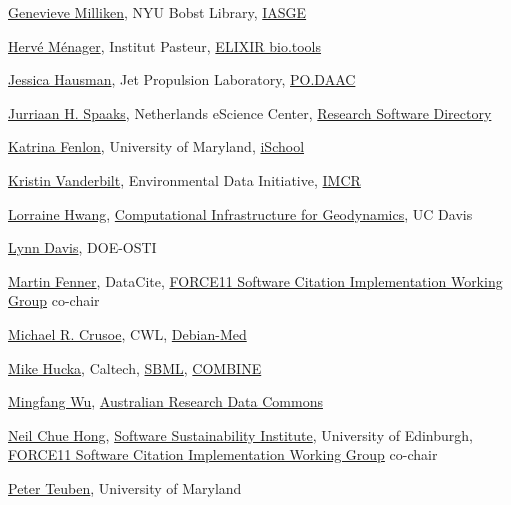 \documentclass[11pt]{article}
\begin{document}
\begin{spacing}{0.86}
\href{https://orcid.org/0000-0002-3057-0659}{Genevieve Milliken}, NYU Bobst Library, \href{https://investigating-archiving-git.gitlab.io/}{IASGE}

\href{https://orcid.org/0000-0002-7552-1009}{Hervé Ménager}, Institut Pasteur, \href{https://bio.tools/}{ELIXIR bio.tools}

\href{https://orcid.org/0000-0002-1861-1526}{Jessica Hausman}, Jet Propulsion Laboratory, \href{https://podaac.jpl.nasa.gov/}{PO.DAAC}

\href{https://orcid.org/0000-0002-7064-4069}{Jurriaan H. Spaaks}, Netherlands eScience Center, \href{https://www.research-software.nl/}{Research Software Directory}

\href{https://orcid.org/0000-0003-1483-5335}{Katrina Fenlon}, University of Maryland, \href{https://ischool.umd.edu/}{iSchool}

\href{https://orcid.org/0000-0003-1439-2204}{Kristin Vanderbilt}, Environmental Data Initiative, \href{https://imcr-hackathon.github.io/website/}{IMCR}

\href{http://orcid.org/0000-0002-1021-3101}{Lorraine Hwang}, \href{https://geodynamics.org/}{Computational Infrastructure for Geodynamics}, UC Davis

\href{https://orcid.org/0000-0002-4670-0964}{Lynn Davis}, DOE-OSTI

\href{https://orcid.org/0000-0003-1419-2405}{Martin Fenner}, DataCite, \href{https://www.force11.org/group/software-citation-implementation-working-group}{FORCE11 Software Citation Implementation Working Group} co-chair

\href{https://orcid.org/0000-0002-2961-9670}{Michael R. Crusoe}, CWL, \href{https://www.debian.org/devel/debian-med/}{Debian-Med}

\href{https://orcid.org/0000-0001-9105-5960}{Mike Hucka}, Caltech, \href{http://sbml.org/Main_Page}{SBML}, \href{http://co.mbine.org}{COMBINE}

\href{https://orcid.org/0000-0003-1206-3431}{Mingfang Wu}, \href{https://ardc.edu.au/}{Australian Research Data Commons}

\href{https://orcid.org/0000-0002-8876-7606}{Neil Chue Hong}, \href{https://www.software.ac.uk/}{Software Sustainability Institute}, University of Edinburgh, \href{https://www.force11.org/group/software-citation-implementation-working-group}{FORCE11 Software Citation Implementation Working Group} co-chair

\href{https://orcid.org/0000-0003-1774-3436}{Peter Teuben}, University of Maryland


\end{spacing}
\end{document}
